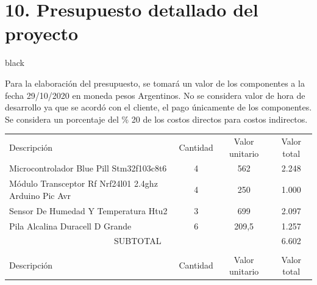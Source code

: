 \documentclass[11pt]{charter}
\begin{document}
\section{10. Presupuesto detallado del proyecto}
\label{sec:presupuesto}

\begin{consigna}{black}

Para la elaboración del presupuesto, se tomará un valor de los componentes a la fecha 29/10/2020 en moneda pesos Argentinos. No se considera valor de hora de desarrollo ya que se acordó con el cliente, el pago únicamente de los componentes. Se considera un porcentaje del \% 20 de los costos directos para costos indirectos.

\end{consigna}

\begin{table}[htpb]
\centering
\begin{tabularx}{\linewidth}{@{}|X|c|r|r|@{}}
\hline
\rowcolor[HTML]{C0C0C0} 
\multicolumn{4}{|c|}{\cellcolor[HTML]{C0C0C0}COSTOS DIRECTOS} \\ \hline
\rowcolor[HTML]{C0C0C0} 
Descripción &
  \multicolumn{1}{c|}{\cellcolor[HTML]{C0C0C0}Cantidad} &
  \multicolumn{1}{c|}{\cellcolor[HTML]{C0C0C0}Valor unitario} &
  \multicolumn{1}{c|}{\cellcolor[HTML]{C0C0C0}Valor total} \\ \hline
  
  Microcontrolador Blue Pill Stm32f103c8t6 &  
  \multicolumn{1}{c|}{4} & 
  \multicolumn{1}{c|}{562} &
  \multicolumn{1}{c|}{2.248} \\ \hline
  
  Módulo Transceptor Rf Nrf24l01 2.4ghz Arduino Pic Avr &
  \multicolumn{1}{c|}{4} &
  \multicolumn{1}{c|}{250} &
  \multicolumn{1}{c|}{1.000} \\ \hline
  
  
  Sensor De Humedad Y Temperatura Htu2 &
  \multicolumn{1}{c|}{3} &
  \multicolumn{1}{c|}{699} &
  \multicolumn{1}{c|}{2.097} \\ \hline
   
  Pila Alcalina Duracell D Grande &
  \multicolumn{1}{c|}{6} &
  \multicolumn{1}{c|}{209,5} &
  \multicolumn{1}{c|}{1.257} \\ \hline
  
\multicolumn{3}{|c|}{SUBTOTAL} &
  \multicolumn{1}{c|}{6.602} \\ \hline
\rowcolor[HTML]{C0C0C0} 
\multicolumn{4}{|c|}{\cellcolor[HTML]{C0C0C0}COSTOS INDIRECTOS} \\ \hline
\rowcolor[HTML]{C0C0C0} 
Descripción & 
  \multicolumn{1}{c|}{\cellcolor[HTML]{C0C0C0}Cantidad} &
  \multicolumn{1}{c|}{\cellcolor[HTML]{C0C0C0}Valor unitario} &
  \multicolumn{1}{c|}{\cellcolor[HTML]{C0C0C0}Valor total} \\ \hline
  

\end{tabularx}
\end{table}
\end{document}
